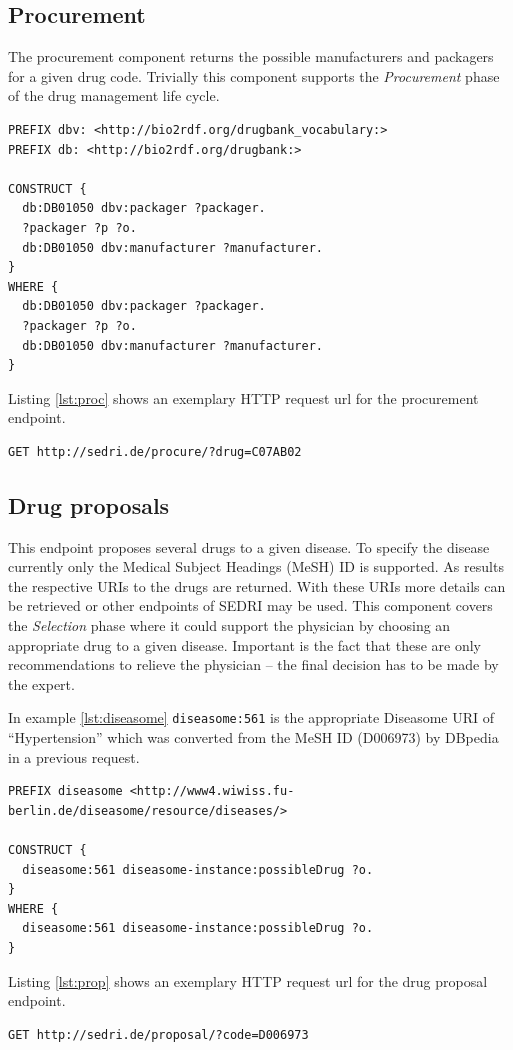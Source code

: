 \subsection*{Procurement}
The procurement component returns the possible manufacturers and packagers for a given drug code.
Trivially this component supports the \textit{Procurement} phase of the drug management life cycle.

\begin{lstlisting}[caption=Example Drugbank query for procurement meta data of Ibuprofen]
PREFIX dbv: <http://bio2rdf.org/drugbank_vocabulary:>
PREFIX db: <http://bio2rdf.org/drugbank:>

CONSTRUCT {
  db:DB01050 dbv:packager ?packager.
  ?packager ?p ?o.
  db:DB01050 dbv:manufacturer ?manufacturer.
}
WHERE {
  db:DB01050 dbv:packager ?packager.
  ?packager ?p ?o.
  db:DB01050 dbv:manufacturer ?manufacturer.
}
\end{lstlisting}
Listing \ref{lst:proc} shows an exemplary HTTP request url for the procurement endpoint.
\begin{lstlisting}[label=lst:proc,caption=Example request for the procurement endpoint]
  GET http://sedri.de/procure/?drug=C07AB02
\end{lstlisting}

\subsection*{Drug proposals}
This endpoint proposes several drugs to a given disease.
To specify the disease currently only the Medical Subject Headings (MeSH) ID is supported.
As results the respective URIs to the drugs are returned.
With these URIs more details can be retrieved or other endpoints of SEDRI may be used.
This component covers the \textit{Selection} phase where it could support the physician by choosing an appropriate drug to a given disease.
Important is the fact that these are only recommendations to relieve the physician -- the final decision has to be made by the expert.

In example \ref{lst:diseasome} \texttt{diseasome:561} is the appropriate Diseasome URI of ``Hypertension'' which was converted from the MeSH ID (D006973) by DBpedia in a previous request.

\begin{lstlisting}[caption=Example Diseasome query for possible drugs of Hypertension,label=lst:diseasome]
PREFIX diseasome <http://www4.wiwiss.fu-berlin.de/diseasome/resource/diseases/>

CONSTRUCT {
  diseasome:561 diseasome-instance:possibleDrug ?o.
}
WHERE {
  diseasome:561 diseasome-instance:possibleDrug ?o.
}
\end{lstlisting}
Listing \ref{lst:prop} shows an exemplary HTTP request url for the drug proposal endpoint.
\begin{lstlisting}[label=lst:prop,caption=Example request for the drug proposal endpoint]
  GET http://sedri.de/proposal/?code=D006973
\end{lstlisting}

